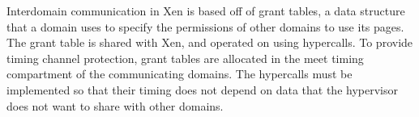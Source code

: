 Interdomain communication in Xen is based off of grant tables, a data structure 
that a domain uses to specify the permissions of other domains to use its 
pages. The grant table is shared with Xen, and operated on using hypercalls. To 
provide timing channel protection, grant tables are allocated in the meet 
timing compartment of the communicating domains. The hypercalls must be 
implemented so that their timing does not depend on data that the 
hypervisor does not want to share with other domains.

